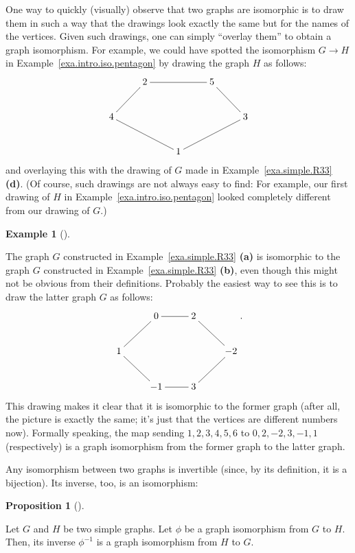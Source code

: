 \documentclass[numbers=enddot,12pt,final,onecolumn,notitlepage]{scrartcl}%
\makeatletter
\theoremstyle{definition}
\newtheorem{prop}[theo]{Proposition}
\newenvironment{proposition}[1][]
{\begin{prop}[#1]\begin{leftbar}}
{\end{leftbar}\end{prop}}
\newtheorem{exam}[theo]{Example}
\newenvironment{example}[1][]
{\begin{exam}[#1]\begin{leftbar}}
{\end{leftbar}\end{exam}}
\newcommand{\are}{\ar@{-}}
\makeatother
\begin{document}
One way to quickly (visually) observe that two graphs are isomorphic
is to draw them in such a way that the drawings look exactly the same
but for the names of the vertices. Given such drawings, one can simply
``overlay them'' to obtain a graph isomorphism.
For example, we could have spotted the isomorphism $G \to H$ in
Example~\ref{exa.intro.iso.pentagon} by drawing the graph $H$ as
follows:
\begin{align*}
\xymatrix{
& 2 \are[rr] & & 5 \are[rd] \\
4 \are[ru] \are[rrd] & & & & 3 \are[lld] \\
& & 1
}
\end{align*}
and overlaying this with the drawing of $G$ made in
Example~\ref{exa.simple.R33} \textbf{(d)}.
(Of course, such drawings are not always easy to find: For example,
our first drawing of $H$ in Example~\ref{exa.intro.iso.pentagon}
looked completely different from our drawing of $G$.)

\begin{example}
The graph $G$ constructed in Example~\ref{exa.simple.R33} \textbf{(a)}
is isomorphic to the graph $G$
constructed in Example~\ref{exa.simple.R33} \textbf{(b)}, even though
this might not be obvious from their definitions. Probably the easiest
way to see this is to draw the latter graph $G$ as follows:
\begin{align*}
\xymatrix{
& 0 \are[r] & 2 \are[rd] \\
1 \are[ru] & & & -2 \are[ld] \\
& -1 \are[lu] & 3 \are[l]
} .
\end{align*}
This drawing makes it clear that it is isomorphic to the former graph
(after all, the picture is exactly the same; it's just that the
vertices are different numbers now). Formally speaking, the map
sending $1, 2, 3, 4, 5, 6$ to $0, 2, -2, 3, -1, 1$ (respectively) is
a graph isomorphism from the former graph to the latter graph.
\end{example}

Any isomorphism between two graphs is invertible (since, by its
definition, it is a bijection). Its inverse, too, is an isomorphism:

\begin{proposition} \label{prop.intro.iso.inverse}
Let $G$ and $H$ be two simple graphs. Let $\phi$ be a graph
isomorphism from $G$ to $H$. Then, its inverse $\phi^{-1}$ is a graph
isomorphism from $H$ to $G$.
\end{proposition}
\end{document}
